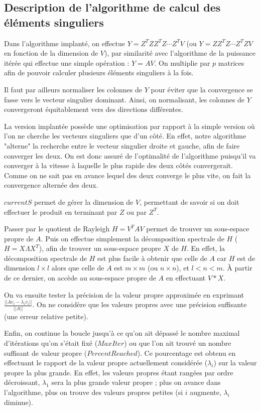 \documentclass[fleqn]{article}
\begin{document}
\pagebreak

\subsection{Description de l'algorithme de calcul des éléments singuliers}

Dans l'algorithme implanté, on effectue $Y = Z^TZZ^TZ\cdots Z^T V$ (ou $Y=ZZ^TZ\cdots Z^TZV$ en fonction de la dimension de $V$), par similarité avec l'algorithme de la puissance itérée qui effectue une simple opération : $Y = AV$. On multiplie par $p$ matrices afin de pouvoir calculer plusieurs éléments singuliers à la fois.

Il faut par ailleurs normaliser les colonnes de $Y$ pour éviter que la convergence se fasse vers le vecteur singulier dominant. Ainsi, on normalisant, les colonnes de $Y$ convergeront équitablement vers des directions différentes. 

La version implantée possède une optimisation par rapport à la simple version où l'on ne cherche les vecteurs singuliers que d'un côté. En effet, notre algorithme "alterne" la recherche entre le vecteur singulier droite et gauche, afin de faire converger les deux. On est donc assuré de l'optimalité de l'algorithme puisqu'il va converger à la vitesse à laquelle le plus rapide des deux côtés convergerait.
Comme on ne sait pas en avance lequel des deux converge le plus vite, on fait la convergence alternée des deux.

$currentS$ permet de gérer la dimension de $V$, permettant de savoir si on doit effectuer le produit en terminant par $Z$ ou par $Z^T$.

Passer par le quotient de Rayleigh $H = V^TAV$ permet de trouver un sous-espace propre de $A$. Puis on effectue simplement la décomposition spectrale de $H$ ($H = X\Lambda X^T$), afin de trouver un sous-espace propre $X$ de $H$. En effet, la décomposition spectrale de $H$ est plus facile à obtenir que celle de $A$ car $H$ est de dimension $l \times l$ alors que celle de $A$ est $m \times m$ (ou $n \times n$), et $l < n < m$.  
\`A partir de ce dernier, on accède au sous-espace propre de $A$ en effectuant $V*X$.

On va ensuite tester la précision de la valeur propre approximée en exprimant 
$\displaystyle \frac{||Av_i - \lambda_iv_i||}{||A||}$.
On ne considère que les valeurs propres avec une précision suffisante (une erreur relative petite).

Enfin, on continue la boucle jusqu'à ce qu'on ait dépassé le nombre maximal d'itérations qu'on s'était fixé ($MaxIter$) ou que l'on ait trouvé un nombre suffisant de valeur propre ($PercentReached$). Ce pourcentage est obtenu en effectuant le rapport de la valeur propre actuellement considérée ($\lambda_i$) sur la valeur propre la plus grande. En effet, les valeurs propres étant rangées par ordre décroissant, $\lambda_1$ sera la plus grande valeur propre ; plus on avance dans l'algorithme, plus on trouve des valeurs propres petites (si $i$ augmente, $\lambda_i$ diminue). 
\end{document}
